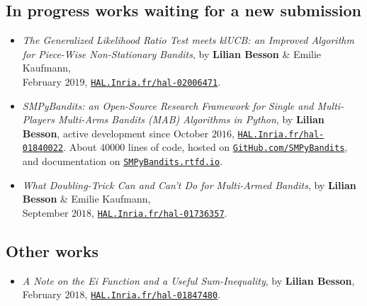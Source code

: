 \subsection{In progress works waiting for a new submission}

\begin{itemize}

\item
    \emph{The Generalized Likelihood Ratio Test meets klUCB: an Improved Algorithm for Piece-Wise Non-Stationary Bandits},
    by \textbf{Lilian Besson} \& Emilie Kaufmann, \\
    February $2019$,
    \href{https://HAL.Inria.fr/hal-02006471}{\texttt{HAL.Inria.fr/hal-02006471}}.
    \cite{Besson2019GLRT}

\item
    \emph{SMPyBandits: an Open-Source Research Framework for Single and Multi-Players Multi-Arms Bandits (MAB) Algorithms in Python},
    by \textbf{Lilian Besson}, active development since October $2016$,
    \href{https://HAL.Inria.fr/hal-01840022}{\texttt{HAL.Inria.fr/hal-01840022}}.
    About $40000$ lines of code, hosted on \href{https://GitHub.com/SMPyBandits}{\texttt{GitHub.com/SMPyBandits}},
    and documentation on \href{https://SMPyBandits.rtfd.io}{\texttt{SMPyBandits.rtfd.io}}.
    \cite{SMPyBandits,SMPyBanditsJMLR}

\item
    \emph{What Doubling-Trick Can and Can't Do for Multi-Armed Bandits},
    by \textbf{Lilian Besson} \& Emilie Kaufmann,\\
    September $2018$,
    \href{https://HAL.Inria.fr/hal-01736357}{\texttt{HAL.Inria.fr/hal-01736357}}.
    \cite{Besson2018DoublingTricks}

\end{itemize}


\subsection{Other works}

\begin{itemize}
\item
    \emph{A Note on the Ei Function and a Useful Sum-Inequality},
    by \textbf{Lilian Besson},
    February $2018$,
    \href{https://HAL.Inria.fr/hal-01847480}{\texttt{HAL.Inria.fr/hal-01847480}}.

\end{itemize}


